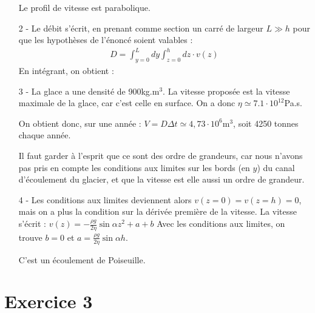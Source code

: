 \documentclass{report}
\begin{document}
\begin{itemize}
Le profil de vitesse est parabolique.

\item[2 - ] Le débit s'écrit, en prenant comme section un carré de largeur $L\gg h$ pour que les hypothèses de l'énoncé soient valables : 
\begin{align*}
	D=\int_{y=0}^{L}dy\int_{z=0}^h dz\cdot v(z)
\end{align*}
En intégrant, on obtient :

\noindent{}

\item[3 - ] La glace a une densité de 900kg.m$^3$. La vitesse proposée est la vitesse maximale de la glace, car c'est celle en surface. On a donc $\eta\simeq7.1\cdot10^{12}$Pa.s.

On obtient donc, sur une année : $V=D\Delta t\simeq4,73\cdot10^6$m$^3$, soit 4250 tonnes chaque année. 

Il faut garder à l'esprit que ce sont des ordre de grandeurs, car nous n'avons pas pris en compte les conditions aux limites sur les bords (en $y$) du canal d'écoulement du glacier, et que la vitesse est elle aussi un ordre de grandeur. 

\item[4 - ] Les conditions aux limites deviennent alors $v(z=0)=v(z=h)=0$, mais on a plus la condition sur la dérivée première de la vitesse. 
La vitesse s'écrit : $v(z)=-\frac{\rho g}{2\eta}\sin\alpha z^2 +a +b$
Avec les conditions aux limites, on trouve $b=0$ et $a=\frac{\rho g}{2\eta}\sin\alpha h$.

\noindent{}

C'est un écoulement de Poiseuille. 

\end{itemize}

\newpage

\section*{Exercice 3}
\end{document}
